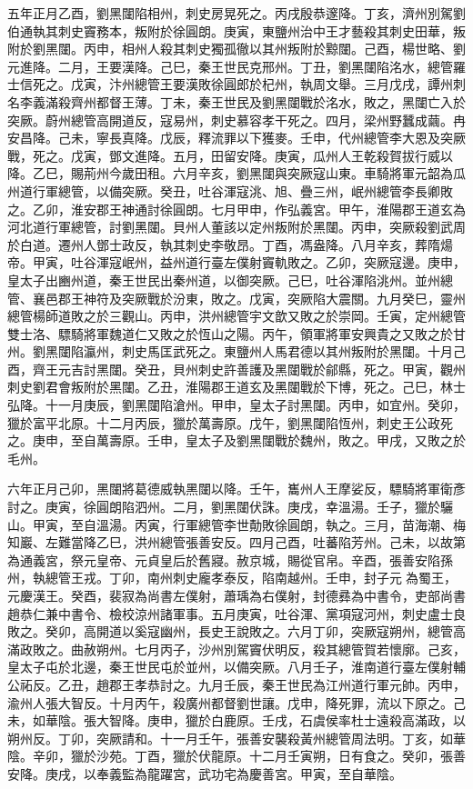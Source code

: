 \begin{pinyinscope}
 五年正月乙酉，劉黑闥陷相州，刺史房晃死之。丙戌殷恭邃降。丁亥，濟州別駕劉伯通執其刺史竇務本，叛附於徐圓朗。庚寅，東鹽州治中王才藝殺其刺史田華，叛附於劉黑闥。丙申，相州人殺其刺史獨孤徹以其州叛附於黥闥。己酉，楊世略、劉元進降。二月，王要漢降。己巳，秦王世民克邢州。丁丑，劉黑闥陷洺水，總管羅士信死之。戊寅，汴州總管王要漢敗徐圓郎於杞州，執周文舉。三月戊戌，譚州刺名李義滿殺齊州都督王薄。丁未，秦王世民及劉黑闥戰於洺水，敗之，黑闥亡入於突厥。蔚州總管高開道反，寇易州，刺史慕容孝干死之。四月，梁州野蠶成繭。冉安昌降。己未，寧長真降。戊辰，釋流罪以下獲麥。壬申，代州總管李大恩及突厥戰，死之。戊寅，鄧文進降。五月，田留安降。庚寅，瓜州人王乾殺賀拔行威以降。乙巳，賜荊州今歲田租。六月辛亥，劉黑闥與突厥寇山東。車騎將軍元韶為瓜州道行軍總管，以備突厥。癸丑，吐谷渾寇洮、旭、疊三州，岷州總管李長卿敗之。乙卯，淮安郡王神通討徐圓朗。七月甲申，作弘義宮。甲午，淮陽郡王道玄為河北道行軍總管，討劉黑闥。貝州人董該以定州叛附於黑闥。丙申，突厥殺劉武周於白道。遷州人鄧士政反，執其刺史李敬昂。丁酉，馮盎降。八月辛亥，葬隋煬帝。甲寅，吐谷渾寇岷州，益州道行臺左僕射竇軌敗之。乙卯，突厥寇邊。庚申，皇太子出豳州道，秦王世民出秦州道，以御突厥。己巳，吐谷渾陷洮州。並州總管、襄邑郡王神符及突厥戰於汾東，敗之。戊寅，突厥陷大震關。九月癸巳，靈州總管楊師道敗之於三觀山。丙申，洪州總管宇文歆又敗之於崇岡。壬寅，定州總管雙士洛、驃騎將軍魏道仁又敗之於恆山之陽。丙午，領軍將軍安興貴之又敗之於甘州。劉黑闥陷瀛州，刺史馬匡武死之。東鹽州人馬君德以其州叛附於黑闥。十月己酉，齊王元吉討黑闥。癸丑，貝州刺史許善護及黑闥戰於鄃縣，死之。甲寅，觀州刺史劉君會叛附於黑闥。乙丑，淮陽郡王道玄及黑闥戰於下博，死之。己巳，林士弘降。十一月庚辰，劉黑闥陷滄州。甲申，皇太子討黑闥。丙申，如宜州。癸卯，獵於富平北原。十二月丙辰，獵於萬壽原。戊午，劉黑闥陷恆州，刺史王公政死之。庚申，至自萬壽原。壬申，皇太子及劉黑闥戰於魏州，敗之。甲戌，又敗之於毛州。



 六年正月己卯，黑闥將葛德威執黑闥以降。壬午，巂州人王摩娑反，驃騎將軍衛彥討之。庚寅，徐圓朗陷泗州。二月，劉黑闥伏誅。庚戌，幸溫湯。壬子，獵於驪山。甲寅，至自溫湯。丙寅，行軍總管李世勣敗徐圓朗，執之。三月，苗海潮、梅知巖、左難當降乙巳，洪州總管張善安反。四月己酉，吐蕃陷芳州。己未，以故第為通義宮，祭元皇帝、元貞皇后於舊寢。赦京城，賜從官帛。辛酉，張善安陷孫州，執總管王戎。丁卯，南州刺史龐孝泰反，陷南越州。壬申，封子元為蜀王，元慶漢王。癸酉，裴寂為尚書左僕射，蕭瑀為右僕射，封德彞為中書令，吏部尚書趙恭仁兼中書令、檢校涼州諸軍事。五月庚寅，吐谷渾、黨項寇河州，刺史盧士良敗之。癸卯，高開道以奚寇幽州，長史王說敗之。六月丁卯，突厥寇朔州，總管高滿政敗之。曲赦朔州。七月丙子，沙州別駕竇伏明反，殺其總管賀若懷廓。己亥，皇太子屯於北邊，秦王世民屯於並州，以備突厥。八月壬子，淮南道行臺左僕射輔公祏反。乙丑，趙郡王孝恭討之。九月壬辰，秦王世民為江州道行軍元帥。丙申，渝州人張大智反。十月丙午，殺廣州都督劉世讓。戊申，降死罪，流以下原之。己未，如華陰。張大智降。庚申，獵於白鹿原。壬戌，石虞侯率杜士遠殺高滿政，以朔州反。丁卯，突厥請和。十一月壬午，張善安襲殺黃州總管周法明。丁亥，如華陰。辛卯，獵於沙苑。丁酉，獵於伏龍原。十二月壬寅朔，日有食之。癸卯，張善安降。庚戌，以奉義監為龍躍宮，武功宅為慶善宮。甲寅，至自華陰。




\end{pinyinscope}
